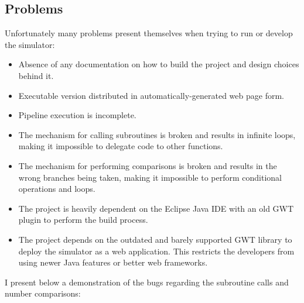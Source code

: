 \subsection*{Problems}

Unfortunately many problems present themselves when trying to run or develop the simulator:

\begin{itemize}
	\item Absence of any documentation on how to build the project and design choices behind it.
	\item Executable version distributed in automatically-generated web page form.
	\item Pipeline execution is incomplete.
	\item The mechanism for calling subroutines is broken and results in infinite loops, making it impossible to delegate code to other functions.
	\item The mechanism for performing comparisons is broken and results in the wrong branches being taken, making it impossible to perform conditional operations and loops.
	\item The project is heavily dependent on the Eclipse Java IDE with an old GWT plugin to perform the build process.
	\item The project depends on the outdated and barely supported GWT library to deploy the simulator as a web application. This restricts the developers from using newer Java features or better web frameworks.
\end{itemize}


I present below a demonstration of the bugs regarding the subroutine calls and number comparisons:

